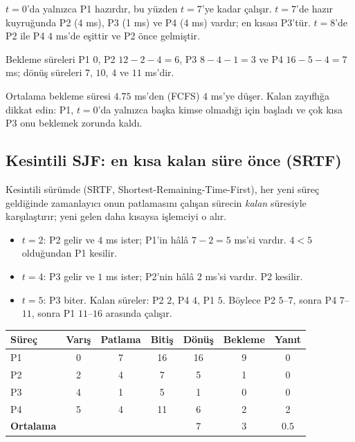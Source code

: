 \documentclass[11pt,a4paper]{article}
\begin{document}
$t=0$'da yalnızca P1 hazırdır, bu yüzden $t=7$'ye kadar çalışır. $t=7$'de hazır kuyruğunda P2 (4 ms), P3 (1 ms) ve P4 (4 ms) vardır; en kısası P3'tür. $t=8$'de P2 ile P4 $4$ ms'de eşittir ve P2 önce gelmiştir.

Bekleme süreleri P1 $0$, P2 $12-2-4=6$, P3 $8-4-1=3$ ve P4 $16-5-4=7$ ms; dönüş süreleri $7$, $10$, $4$ ve $11$ ms'dir.

Ortalama bekleme süresi $4.75$ ms'den (FCFS) $4$ ms'ye düşer. Kalan zayıflığa dikkat edin: P1, $t=0$'da yalnızca başka kimse olmadığı için başladı ve çok kısa P3 onu beklemek zorunda kaldı.

\subsection{Kesintili SJF: en kısa kalan süre önce (SRTF)}

Kesintili sürümde (SRTF, Shortest-Remaining-Time-First), her yeni süreç geldiğinde zamanlayıcı onun patlamasını çalışan sürecin \emph{kalan} süresiyle karşılaştırır; yeni gelen daha kısaysa işlemciyi o alır.

\begin{center}
\end{center}

\begin{itemize}
  \item $t=2$: P2 gelir ve $4$ ms ister; P1'in hâlâ $7-2=5$ ms'si vardır. $4<5$ olduğundan P1 kesilir.
  \item $t=4$: P3 gelir ve $1$ ms ister; P2'nin hâlâ $2$ ms'si vardır. P2 kesilir.
  \item $t=5$: P3 biter. Kalan süreler: P2 $2$, P4 $4$, P1 $5$. Böylece P2 $5$--$7$, sonra P4 $7$--$11$, sonra P1 $11$--$16$ arasında çalışır.
\end{itemize}

\begin{center}
\renewcommand{\arraystretch}{1.2}
\begin{tabular}{@{}lcccccc@{}}
\toprule
\textbf{Süreç} & \textbf{Varış} & \textbf{Patlama} & \textbf{Bitiş} & \textbf{Dönüş} & \textbf{Bekleme} & \textbf{Yanıt}\\
\midrule
P1 & 0 & 7 & 16 & 16 & 9 & 0\\
P2 & 2 & 4 & 7 & 5 & 1 & 0\\
P3 & 4 & 1 & 5 & 1 & 0 & 0\\
P4 & 5 & 4 & 11 & 6 & 2 & 2\\
\midrule
\textbf{Ortalama} & & & & $7$ & $3$ & $0.5$\\
\bottomrule
\end{tabular}
\end{center}
\end{document}
